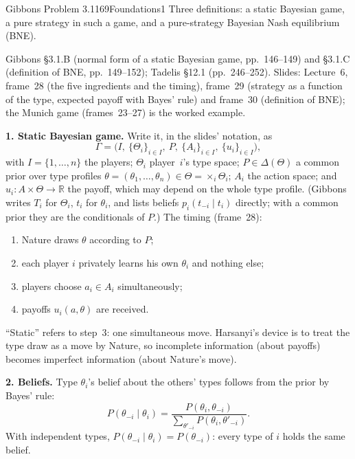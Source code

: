 \begin{exsol}{Gibbons Problem 3.1}{169}{Foundations}{1}
\asked Three definitions: a static Bayesian game, a pure strategy in such a game, and a
pure-strategy Bayesian Nash equilibrium (BNE).

\method Gibbons \S3.1.B (normal form of a static Bayesian game, pp.~146--149) and \S3.1.C
(definition of BNE, pp.~149--152); Tadelis \S12.1 (pp.~246--252). Slides: Lecture~6, frame~28
(the five ingredients and the timing), frame~29 (strategy as a function of the type, expected
payoff with Bayes' rule) and frame~30 (definition of BNE); the Munich game (frames~23--27) is
the worked example.

\solution
\textbf{1. Static Bayesian game.} Write it, in the slides' notation, as
\[
  \Gamma = \bigl(I,\ \{\Theta_i\}_{i\in I},\ P,\ \{A_i\}_{i\in I},\ \{u_i\}_{i\in I}\bigr),
\]
with $I = \{1,\dots,n\}$ the players; $\Theta_i$ player~$i$'s type space; $P \in \Delta(\Theta)$
a common prior over type profiles $\theta = (\theta_1,\dots,\theta_n) \in \Theta =
\times_i \Theta_i$; $A_i$ the action space; and $u_i : A \times \Theta \to \mathbb R$ the payoff,
which may depend on the whole type profile. (Gibbons writes $T_i$ for $\Theta_i$, $t_i$ for
$\theta_i$, and lists beliefs $p_i(t_{-i}\mid t_i)$ directly; with a common prior they are the
conditionals of $P$.) The timing (frame~28):
\begin{enumerate}
  \item Nature draws $\theta$ according to $P$;
  \item each player $i$ privately learns his own $\theta_i$ and nothing else;
  \item players choose $a_i \in A_i$ simultaneously;
  \item payoffs $u_i(a,\theta)$ are received.
\end{enumerate}
``Static'' refers to step~3: one simultaneous move. Harsanyi's device is to treat the type draw
as a move by Nature, so incomplete information (about payoffs) becomes imperfect information
(about Nature's move).

\textbf{2. Beliefs.} Type $\theta_i$'s belief about the others' types follows from the prior by
Bayes' rule:
\[
  P(\theta_{-i}\mid\theta_i) = \frac{P(\theta_i,\theta_{-i})}{\sum_{\theta'_{-i}} P(\theta_i,\theta'_{-i})}.
\]
With independent types, $P(\theta_{-i}\mid\theta_i) = P(\theta_{-i})$: every type of $i$ holds the
same belief.


\end{exsol}
